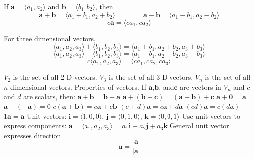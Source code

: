 \documentclass{article}
\begin{document}
    \begin{outline}
        \1 If \(\mathbf a=\langle a_1,a_2\rangle\) and \(\mathbf b=\langle b_1,b_2\rangle\), then \[\mathbf a+\mathbf b=\langle a_1+b_1,a_2+b_2\rangle\qquad\qquad\mathbf a-\mathbf b=\langle a_1-b_1,a_2-b_2\rangle\]\[c\mathbf a=\langle ca_1,ca_2\rangle \]
    
        \1 For three dimensional vectors, \[\langle a_1,a_2,a_3\rangle+\langle b_1, b_2,b_3\rangle=\langle a_1+b_1, a_2+b_2,a_3+b_3\rangle\]\[\langle a_1,a_2,a_3\rangle-\langle b_1, b_2,b_3\rangle=\langle a_1-b_1, a_2-b_2, a_3-b_3\rangle\]\[c\langle a_1,a_2,a_3\rangle=\langle ca_1,ca_2,ca_3\rangle\]
        \end{outline}\begin{multicols}{2}\begin{outline}
        \1 \(V_2\) is the set of all 2-D vectors. \(V_3\) is the set of all 3-D vectors. \(V_n\) is the set of all $n$-dimensional vectors. 
        \1 Properties of vectors. If \(\mathbf a\),\(\mathbf{b}\), and\(\mathbf c\) are vectors in \(V_n\) and $c$ and $d$ are scalars, then: 
            \2 \(\mathbf a+\mathbf b=\mathbf b+\mathbf a\)
            \2 \(\mathbf a+(\mathbf b+\mathbf c)=(\mathbf a+\mathbf b)+\mathbf c\)
            \2 \(\mathbf a+\mathbf 0=\mathbf a\)
            \2 \(\mathbf a+(-\mathbf a)=0\)
            \2 \(c(\mathbf a+\mathbf b)=c\mathbf a+c\mathbf b\)
            \2 \((c+d)\mathbf a=c\mathbf a+d\mathbf a\)
            \2 \((cd)\mathbf a=c(d\mathbf a)\)
            \2 \(1\mathbf a=\mathbf a\)
        \1 Unit vectors: \(\mathbf i=\langle 1,0,0\rangle\), \(\mathbf j=\langle 0,1,0\rangle\), \(\mathbf k=\langle 0,0,1\rangle\)
        \1 Use unit vectors to express components: \(\mathbf a=\langle a_1,a_2,a_3\rangle=a_1\mathbf i+a_2\mathbf j+a_3\mathbf k\)
        \1 General unit vector expresses direction \[\mathbf u=\dfrac{\mathbf a}{|\mathbf a|}\]
        

    \end{outline}

\end{multicols}
\end{document}
